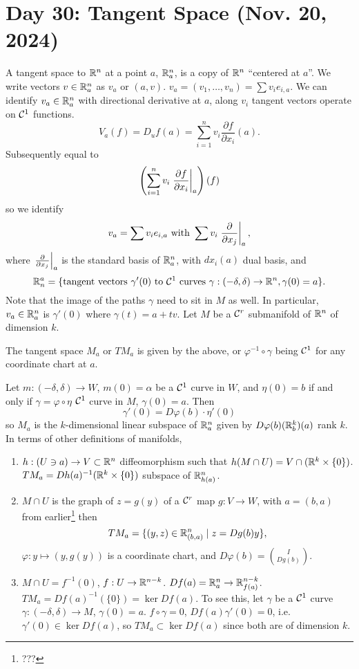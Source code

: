 \section{Day 30: Tangent Space (Nov. 20, 2024)}
A tangent space to $\mathbb R^n$ at a point $a$, $\mathbb R_a^n$, is a copy of $\mathbb R^n$ ``centered at $a$''. We write vectors $v \in \mathbb R_a^n$ as $v_a$ or $(a, v)$. $v_a = (v_1, \dots, v_n) = \sum v_i e_{i,a}$. We can identify $v_a \in \mathbb R_a^n$ with directional derivative at $a$, along $v_i$ tangent vectors operate on $\mathcal C^1$ functions.
\[ V_a(f) = D_u f(a) = \sum_{i=1}^n v_i \frac{\partial f}{\partial x_i}(a). \]
Subsequently equal to
\[ \left( \sum_{i=1}^n v_i \left.\frac{\partial f}{\partial x_i}\right\rvert_{a}^{} \right)(f) \]
so we identify
\[ v_a = \sum v_ie_{i,a} \text{ with } \sum v_i \left.\frac{\partial}{\partial x_j}\right\rvert_{a}^{}, \]
where $\left.\frac{\partial}{\partial x_j}\right\rvert_{a}^{}$ is the standard basis of $\mathbb R^n_a$, with $dx_i(a)$ dual basis, and
\[ \mathbb R_n^a = \{ \text{tangent vectors } \gamma'(0) \text{ to } \mathcal C^1 \text{ curves } \gamma : (-\delta, \delta) \to \mathbb R^n, \gamma(0) = a \}. \]
Note that the image of the paths $\gamma$ need to sit in $M$ as well. In particular, $v_a \in \mathbb R_a^n$ is $\gamma'(0)$ where $\gamma(t) = a + tv$. Let $M$ be a $\mathcal C^r$ submanifold of $\mathbb R^n$ of dimension $k$.
\begin{definition}
    The tangent space $M_a$ or $TM_a$ is given by the above, or $\varphi^{-1} \circ \gamma$ being $\mathcal C^1$ for any coordinate chart at $a$.
\end{definition}
\noindent Let $m : (-\delta, \delta) \to W$, $m(0) = \alpha$ be a $\mathcal C^1$ curve in $W$, and $\eta(0) = b$ if and only if $\gamma = \varphi \circ \eta$ $\mathcal C^1$ curve in $M$, $\gamma(0) = a$. Then
\[ \gamma'(0) = D \varphi(b) \cdot \eta'(0) \]
so $M_a$ is the $k$-dimensional linear subspace of $\mathbb R_a^n$ given by $D \varphi(b)(\mathbb R_b^k)(a)$ rank $k$. In terms of other definitions of manifolds,
\begin{enumerate}[label=(\roman*)]
    \item $h : (U \ni a) \to V \subset \mathbb R^n$ diffeomorphism such that $h(M \cap U) = V \cap (\mathbb R^k \times \{0\})$. $TM_a = Dh(a)^{-1} (\mathbb R^k \times \{0\})$ subspace of $\mathbb R_{h(a)}^n$.
    \item $M \cap U$ is the graph of $z = g(y)$ of a $\mathcal C^r$ map $g : V \to W$, with $a = (b, a)$ from earlier\footnote{???} then
    \[ TM_a = \{(y, z) \in \mathbb R_{(b, a)}^n \mid z = Dg(b) y \}, \]
    $\varphi : y \mapsto (y, g(y))$ is a coordinate chart, and $D \varphi(b) = \binom{I}{Dg(b)}$.
    \item $M \cap U = f^{-1}(0)$, $f : U \to \mathbb R^{n-k}$. $Df(a) = \mathbb R_a^n \to \mathbb R_{f(a)}^{n-k}$. $TM_a = Df(a)^{-1}(\{0\}) = \ker Df(a)$. To see this, let $\gamma$ be a $\mathcal C^1$ curve $\gamma : (-\delta, \delta) \to M$, $\gamma(0) = a$. $f \circ \gamma = 0$, $Df(a)\gamma'(0) = 0$, i.e. $\gamma'(0) \in \ker Df(a)$, so $TM_a \subset \ker Df(a)$ since both are of dimension $k$.  
\end{enumerate}
